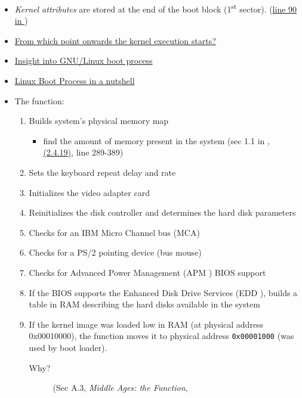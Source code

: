 \begin{itemize}
\item \emph{Kernel attributes} are stored at the end of the boot block
  (1\textsuperscript{st}
  sector). (\href{http://lxr.linux.no/linux+v2.6.11/arch/i386/boot/bootsect.S#L90}{line 90 in
    })
\item
  \href{http://lists.kernelnewbies.org/pipermail/kernelnewbies/2011-March/001133.html}{From
    which point onwards the kernel execution starts?}
\item
  \href{http://unixbhaskar.blogspot.com/2010/03/insight-into-gnulinux-boot-process.html}{Insight
    into GNU/Linux boot process}
\item
  \href{http://linux-development-for-fresher.blogspot.com/2012/07/linux-boot-process-in-nutshell.html}{Linux
    Boot Process in a nutshell}
\item The  function:
  \begin{enumerate}
  \item Builds system's physical memory map
    \begin{itemize}
    \item find the amount of memory present in the system (sec 1.1 in
      \cite{abhishek2002memory}, \href{http://lxr.linux.no/linux-old+v2.4.19/arch/i386/boot/setup.S#L289}{
        (2.4.19)}, line 289-389)
    \end{itemize}
  \item Sets the keyboard repeat delay and rate
  \item Initializes the video adapter card
  \item Reinitializes the disk controller and determines the hard disk parameters
  \item Checks for an IBM Micro Channel bus (MCA)
  \item Checks for a PS/2 pointing device (bus mouse)
  \item Checks for Advanced Power Management (APM ) BIOS support
  \item If the BIOS supports the Enhanced Disk Drive Services (EDD ), builds a table in
    RAM describing the hard disks available in the system
  \item If the kernel image was loaded low in RAM (at physical address 0x00010000), the
    function moves it to physical address \texttt{0x00001000} (was used by boot loader).
    \begin{description}
    \item[Why?] (Sec A.3, \emph{Middle Ages: the  Function},

\end{description}
\end{enumerate}
\end{itemize}
